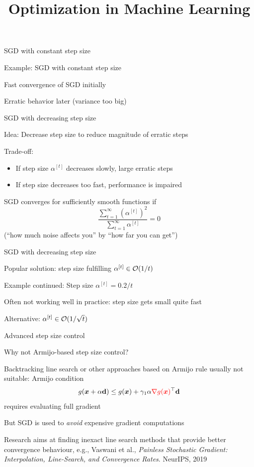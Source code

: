\documentclass[11pt,compress,t,notes=noshow, xcolor=table]{beamer}
\title{Optimization in Machine Learning}
\begin{document}

\begin{framei}{SGD with constant step size}
\item Example: SGD with constant step size
\vfill
{}
\vfill
\item Fast convergence of SGD initially
\item Erratic behavior later (variance too big)
\end{framei}


\begin{framei}{SGD with decreasing step size}
\item Idea: Decrease step size to reduce magnitude of erratic steps
\item Trade-off:
\begin{itemize}
\item If step size $\alpha^{[t]}$ decreases slowly, large erratic steps
\item If step size decreases too fast, performance is impaired
\end{itemize}
\item SGD converges for sufficiently smooth functions if
$$
\frac{\sum_{t = 1}^\infty \left(\alpha^{[t]}\right)^2}{\sum_{t = 1}^\infty \alpha^{[t]}} = 0
$$
(``how much noise affects you'' by ``how far you can get'')
\end{framei}
\begin{framei}{SGD with decreasing step size}
\item Popular solution: step size fulfilling $\alpha^{[t]} \in \mathcal{O}(1/t)$
\vfill
{}
\vfill
\item Example continued: Step size $\alpha^{[t]} = 0.2/t$
\item Often not working well in practice: step size gets small quite fast
\item Alternative: $\alpha^{[t]} \in \mathcal{O}(1/\sqrt{t})$
\end{framei}


\begin{framev}{Advanced step size control}
\begin{blocki}{Why not Armijo-based step size control?}
\item Backtracking line search or other approaches based on Armijo rule usually not suitable: Armijo condition
$$
g(\bm{x} + \alpha \mathbf{d}) \le g(\bm{x}) + \gamma_1 \alpha \textcolor{red}{\nabla g(\bm{x})}^\top \mathbf{d}
$$
requires evaluating full gradient
\item But SGD is used to \emph{avoid} expensive gradient computations
\item Research aims at finding inexact line search methods that provide better convergence behaviour, e.g., Vaswani et al., \emph{Painless Stochastic Gradient: Interpolation, Line-Search, and Convergence Rates}. NeurIPS, 2019
\end{blocki}
\end{framev}
\end{document}
